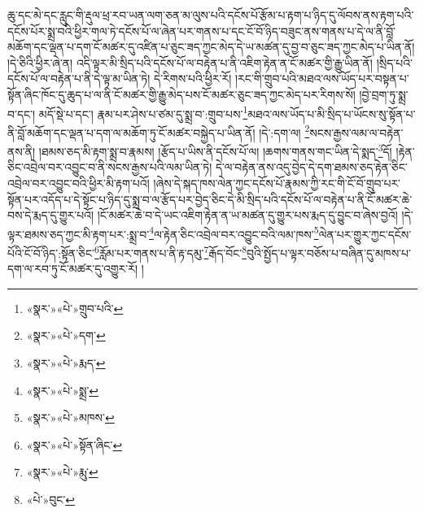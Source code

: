 ཆུ་དང་མེ་དང་རླུང་གི་རྡུལ་ཕྲ་རབ་ཡན་ལག་ཅན་མ་ལུས་པའི་དངོས་པོ་རྩོམ་པ་རྟག་པ་ཉིད་དུ་ལོབས་ནས་རྟག་པའི་དངོས་པོར་སྨྲ་བའི་ཕྱིར་གལ་ཏེ་དངོས་པོ་ལ་ཞེན་པར་གནས་པ་དང་ངོ་བོ་ཉིད་བཟུང་ནས་གནས་པ་དེ་ལ་ནི་བློ་མཆོག་དང་ལྡན་པ་དག་ངོ་མཚར་དུ་འཛིན་པ་ཅུང་ཟད་ཀྱང་མེད་དེ་ཡ་མཚན་དུ་བྱ་བ་ཅུང་ཟད་ཀྱང་མེད་པ་ཡིན་ནོ། །དེ་ཅིའི་ཕྱིར་ཞེ་ན། འདི་ལྟར་མི་སྲིད་པའི་དངོས་པོ་ལ་བརྟེན་པ་ནི་འཇིག་རྟེན་ན་ངོ་མཚར་གྱི་རྒྱུ་ཡིན་ནོ། །སྲིད་པའི་དངོས་པོ་ལ་བརྟེན་པ་ནི་དེ་ལྟ་མ་ཡིན་ཏེ། དེ་རིགས་པའི་ཕྱིར་རོ། །རང་གི་གྲུབ་པའི་མཐའ་ལས་ཡོད་པར་བསྟན་པ་སྟོན་ཞིང་ཁོང་དུ་ཆུད་པ་ལ་ནི་ངོ་མཚར་གྱི་རྒྱུ་མེད་པས་ངོ་མཚར་ཅུང་ཟད་ཀྱང་མེད་པར་རིགས་སོ། །བྱེ་བྲག་ཏུ་སྨྲ་བ་དང་། མདོ་སྡེ་པ་དང་། རྣམ་པར་ཤེས་པ་ཙམ་དུ་སྨྲ་བ་:གྲུབ་པས་\footnote{«སྣར་»«པེ་»གྲུབ་པའི་}མཐའ་ལས་ཡོད་པ་མི་སྲིད་པ་ཡོངས་སུ་སྟོན་པ་ནི་བློ་མཆོག་དང་ལྡན་པ་དག་ལ་མཆོག་ཏུ་ངོ་མཚར་བསྐྱེད་པ་ཡིན་ནོ། །དེ་:དག་ལ། \footnote{«སྣར་»«པེ་»དག་}སངས་རྒྱས་ལམ་ལ་བརྟེན་ནས་ནི། །ཐམས་ཅད་མི་རྟག་སྨྲ་བ་རྣམས། །རྩོད་པ་ཡིས་ནི་དངོས་པོ་ལ། །ཆགས་གནས་གང་ཡིན་དེ་སྨད་\footnote{«སྣར་»«པེ་»རྨད་}དོ། །རྟེན་ཅིང་འབྲེལ་བར་འབྱུང་བ་ནི་སངས་རྒྱས་པའི་ལམ་ཡིན་ཏེ། དེ་ལ་བརྟེན་ནས་འདུ་བྱེད་དེ་དག་ཐམས་ཅད་རྟེན་ཅིང་འབྲེལ་བར་འབྱུང་བའི་ཕྱིར་མི་རྟག་པའོ། །ཞེས་དེ་སྐད་ཁས་ལེན་ཀྱང་དངོས་པོ་རྣམས་ཀྱི་རང་གི་ངོ་བོ་གྲུབ་པར་སྟོན་པར་འདོད་པ་དེ་སྟོང་པ་ཉིད་དུ་སྨྲ་བ་ལ་རྩོད་པར་བྱེད་ཅིང་དེ་མི་སྲིད་པའི་དངོས་པོ་ལ་བརྟེན་པ་ནི་ངོ་མཚར་ཆེ་བས་དེ་རྨད་དུ་གྱུར་པའོ། །ངོ་མཚར་ཆེ་བ་དེ་ཡང་འཇིག་རྟེན་ན་ཡ་མཚན་དུ་གྱུར་པས་རྨད་དུ་བྱུང་བ་ཞེས་བྱའོ། །དེ་ལྟར་ཐམས་ཅད་ཀྱང་མི་རྟག་པར་:སྨྲ་བ་\footnote{«སྣར་»«པེ་»སྨྲ་}ལ་རྟེན་ཅིང་འབྲེལ་བར་འབྱུང་བའི་ལམ་ཁས་\footnote{«སྣར་»«པེ་»མཁས་}ལེན་པར་གྱུར་ཀྱང་དངོས་པོའི་ངོ་བོ་ཉིད་:སྟོན་ཅིང་\footnote{«སྣར་»«པེ་»སྟོན་ཞིང་}རློམ་པར་གནས་པ་ནི་རྟ་དམུ་\footnote{«སྣར་»«པེ་»རྨུ་}རྒོད་བོང་\footnote{«པེ་»བུང་}བུའི་སྤྱོད་པ་ལྟར་བཅོས་པ་བཞིན་དུ་མཁས་པ་དག་ལ་རབ་ཏུ་ངོ་མཚར་དུ་འགྱུར་རོ། །
